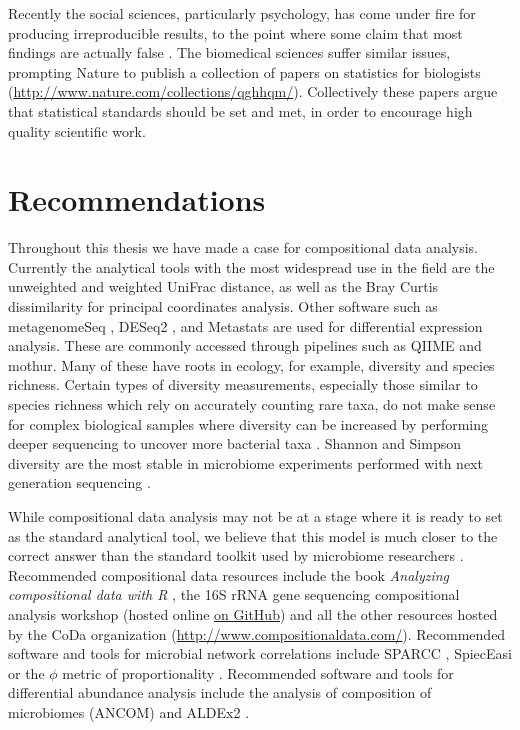 Recently the social sciences, particularly psychology, has come under fire for producing irreproducible results, to the point where some claim that most findings are actually false \cite{ioannidis2005most}. The biomedical sciences suffer similar issues, prompting Nature to publish a collection of papers on statistics for biologists (\url{http://www.nature.com/collections/qghhqm/}). Collectively these papers argue that statistical standards should be set and met, in order to encourage high quality scientific work.

\section{Recommendations}
Throughout this thesis we have made a case for compositional data analysis. Currently the analytical tools with the most widespread use in the field are the unweighted and weighted UniFrac distance, as well as the Bray Curtis dissimilarity for principal coordinates analysis. Other software such as metagenomeSeq \cite{paulson2014metagenomeseq}, DESeq2 \cite{love2014moderated}, and Metastats \cite{paulson2011metastats} are used for differential expression analysis. These are commonly accessed through pipelines such as QIIME and mothur. Many of these have roots in ecology, for example, diversity and species richness. Certain types of diversity measurements, especially those similar to species richness which rely on accurately counting rare taxa, do not make sense for complex biological samples where diversity can be increased by performing deeper sequencing to uncover more bacterial taxa \cite{haegeman2013robust}. Shannon and Simpson diversity are the most stable in microbiome experiments performed with next generation sequencing \cite{haegeman2013robust}.

While compositional data analysis may not be at a stage where it is ready to set as the standard analytical tool, we believe that this model is much closer to the correct answer than the standard toolkit used by microbiome researchers \cite{gloor2016s} \cite{gloor2016compositional} \cite{fernandes2013anova} \cite{fernandes2014unifying}. Recommended compositional data resources include the book \textit{Analyzing compositional data with R} \cite{van2013analyzing}, the 16S rRNA gene sequencing compositional analysis workshop (hosted online \href{https://github.com/ggloor/compositions/blob/master/background_reading/CJM_supplement/workshop.pdf}{on GitHub}) and all the other resources hosted by the CoDa organization (\url{http://www.compositionaldata.com/}). Recommended software and tools for microbial network correlations include SPARCC \cite{friedman2012inferring}, SpiecEasi \cite{kurtz2015sparse} or the $\phi$ metric of proportionality \cite{lovell2015proportionality}. Recommended software and tools for differential abundance analysis include the analysis of composition of microbiomes (ANCOM) \cite{mandal2015analysis} and ALDEx2 \cite{fernandes2014unifying}.

